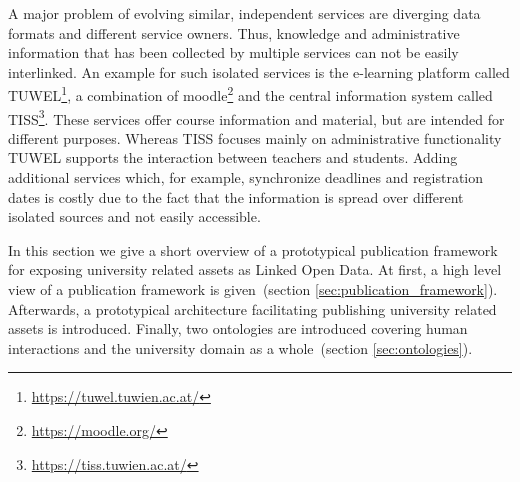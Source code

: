 \documentclass{article}
\begin{document}
A major problem of evolving similar, independent services are diverging data formats and different service owners. Thus, knowledge and administrative information that has been collected by multiple services can not be easily interlinked. An example for such isolated services is the e-learning platform called TUWEL\footnote{\url{https://tuwel.tuwien.ac.at/}}, a combination of moodle\footnote{\url{https://moodle.org/}} and the central information system called TISS\footnote{\url{https://tiss.tuwien.ac.at/}}. These services offer course information and material, but are intended for different purposes. Whereas TISS focuses mainly on administrative functionality TUWEL supports the interaction between teachers and students. 
Adding additional services which, for example, synchronize deadlines and registration dates is costly due to the fact that the information is spread over different isolated sources and not easily accessible. 

In this section we give a short overview of a prototypical publication framework for exposing university related assets as Linked Open Data. At first, a high level view of a publication framework is given~(section \ref{sec:publication_framework}). Afterwards, a prototypical architecture facilitating publishing university related assets is introduced. Finally, two ontologies are introduced covering human interactions and the university domain as a whole~(section \ref{sec:ontologies}). 
\end{document}
